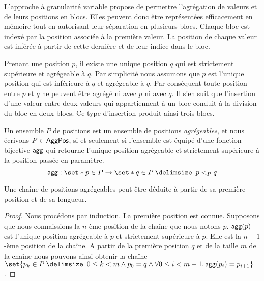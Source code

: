 L'approche à granularité variable propose de permettre l'agrégation de valeurs et de leurs positions en blocs.
Elles peuvent donc être représentées efficacement en mémoire tout en autorisant leur séparation en plusieurs blocs.
Chaque bloc est indexé par la position associée à la première valeur.
La position de chaque valeur est inférée à partir de cette dernière et de leur indice dans le bloc.

Prenant une position $p$, il existe une unique position $q$ qui est strictement supérieure et agrégeable à $q$.
Par simplicité nous assumons que $p$ est l'unique position qui est inférieure à $q$ et agrégeable à $q$.
Par conséquent toute position entre $p$ et $q$ ne peuvent être agrégé ni avec $p$ ni avec $q$.
Il s'en suit que l'insertion d'une valeur entre deux valeurs qui appartiennent à un bloc conduit à la division du bloc en deux blocs.
Ce type d'insertion produit ainsi trois blocs.

\begin{definition}\label{def:offest-positions}
Un ensemble $P$ de positions est un ensemble de positions \emph{agrégeables}, et nous écrivons $P \in \operatorname{\mathsf{AggPos}}$, si et seulement si l'ensemble est équipé d'une fonction bijective $\operatorname{\mathsf{agg}}$ qui retourne l'unique position agrégeable et strictement supérieure à la position passée en paramètre.
\begin{equation*}
    \trm{agg}: \set*{p \in P} \to \set*{q \in P \given p <_P q}
\end{equation*}
\end{definition}

\begin{theorem}
Une chaîne de positions agrégeables peut être déduite à partir de sa première position et de sa longueur.
\end{theorem}

\begin{proof}
Nous procédons par induction. La première position est connue. Supposons que nous connaissions la $n$-ème position de la chaîne que nous notons $p$.
$\operatorname{\mathsf{agg}}(p)$ est l'unique position agrégeable à $p$ et strictement supérieure à $p$.
Elle est la $n+1$-ème position de la chaîne.
A partir de la première position $q$ et de la taille $m$ de la chaîne nous pouvons ainsi obtenir la chaîne $\set{p_k \in P \given 0 \leq k < m \land p_0 = q \land \forall 0 \leq i < m-1 \qsep \trm{agg}(p_i) = p_{i+1}}$.
\end{proof}


